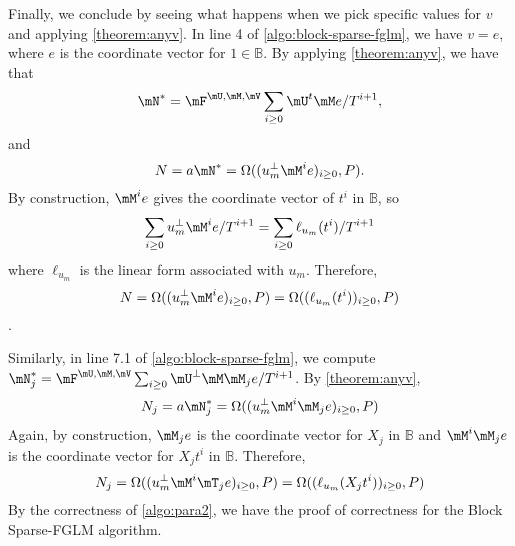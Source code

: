 \documentclass[12pt]{article}
\begin{document}
Finally, we conclude by seeing what happens
when we pick specific values for $v$ and applying \cref{theorem:anyv}.
In line 4 of \cref{algo:block-sparse-fglm}, we have $v = e$, 
where $e$ is the coordinate vector for $1 \in \mathbb{B}$.
By applying \cref{theorem:anyv}, we have that
$$\mN^* = \mF^{\mU,\mM,\mV}\sum_{i\ge0}\mU^t \mM e/T^{i+1},$$  and
$$N = a\mN^* = \Omega((u_m^{\perp} \mM^i e)_{i\ge 0},P).$$
By construction,
$\mM^i e$ gives the coordinate vector of $t^i$ in $\mathbb{B}$, so
$$\sum_{i\ge 0} u_m^{\perp} \mM^i e/T^{i+1} = \sum_{i\ge0} \ell_{u_m}(t^i)/T^{i+1}$$ 
where $\ell_{u_m}$ is the linear form associated with $u_m$. Therefore, 
$$N = \Omega((u_m^{\perp} \mM^i e)_{i\ge 0},P) = \Omega( (\ell_{u_m}(t^i))_{i\ge 0},P)$$.

Similarly, in line 7.1 of \cref{algo:block-sparse-fglm}, we compute
$\mN^*_j = \mF^{\mU,\mM,\mV}\sum_{i\ge0} \mU^{\perp} \mM \mM_j e / T^{i+1}$. By \cref{theorem:anyv},
$$N_j = a \mN^*_j = \Omega((u_m^{\perp} \mM^i \mM_j e)_{i\ge 0},P) $$
Again, by construction, $\mM_j e$ is the coordinate vector for $X_j$ in 
$\mathbb{B}$ and $\mM^i \mM_j e$ is the coordinate vector for $X_jt^i$ in
$\mathbb{B}$. Therefore,
$$ N_j =  \Omega((u_m^{\perp} \mM^i \mT_j e)_{i\ge 0},P) =
 \Omega( (\ell_{u_m}(X_jt^i))_{i\ge 0},P)$$
By the correctness of \cref{algo:para2}, we have the proof
of correctness for the Block Sparse-FGLM algorithm.

\newpage
\end{document}
